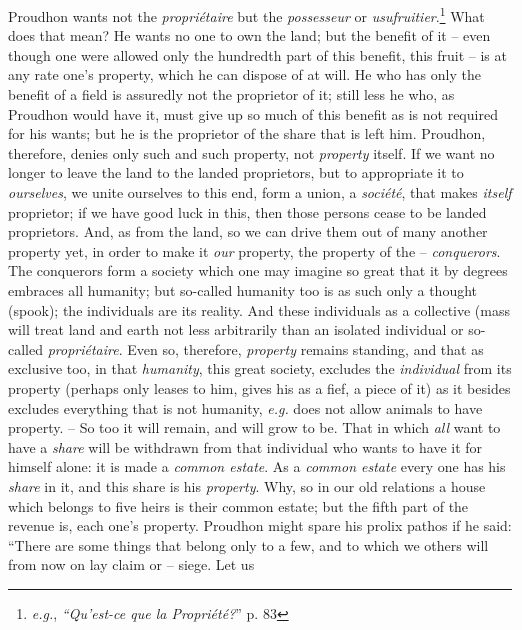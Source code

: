 Proudhon wants not the \textit{propri\'etaire} but the \textit{possesseur} or 
\textit{usufruitier}.\footnote{\textit{e.g.}, \textit{``Qu'est-ce que la 
Propri\'et\'e?}'' p. 83} What does that mean? He wants no one to own the 
land; but the benefit of it -- even though one were allowed only the hundredth 
part of this benefit, this fruit -- is at any rate one's property, which he 
can dispose of at will. He who has only the benefit of a field is assuredly 
not the proprietor of it; still less he who, as Proudhon would have it, must 
give up so much of this benefit as is not required for his wants; but he is 
the proprietor of the share that is left him. Proudhon, therefore, denies only 
such and such property, not \textit{property} itself. If we want no longer to 
leave the land to the landed proprietors, but to appropriate it to 
\textit{ourselves}, we unite ourselves to this end, form a union, a 
\textit{soci\'et\'e}, that makes \textit{itself} proprietor; if we have good 
luck in this, then those persons cease to be landed proprietors. And, as from 
the land, so we can drive them out of many another property yet, in order to 
make it \textit{our} property, the property of the -- \textit{conquerors}. The 
conquerors form a society which one may imagine so great that it by degrees 
embraces all humanity; but so-called humanity too is as such only a thought 
(spook); the individuals are its reality. And these individuals as a 
collective (mass will treat land and earth not less arbitrarily than an 
isolated individual or so-called \textit{propri\'etaire}. Even so, therefore, 
\textit{property} remains standing, and that as exclusive too, in that 
\textit{humanity}, this great society, excludes the \textit{individual} from 
its property (perhaps only leases to him, gives his as a fief, a piece of it) 
as it besides excludes everything that is not humanity, \textit{e.g.} does 
not allow animals to have property. -- So too it will remain, and will grow to 
be. That in which \textit{all} want to have a \textit{share} will be withdrawn 
from that individual who wants to have it for himself alone: it is made a 
\textit{common estate}. As a \textit{common estate} every one has his 
\textit{share} in it, and this share is his \textit{property}. Why, so in our 
old relations a house which belongs to five heirs is their common estate; but 
the fifth part of the revenue is, each one's property. Proudhon might spare 
his prolix pathos if he said: ``There are some things that belong only to a 
few, and to which we others will from now on lay claim or -- siege. Let us 
